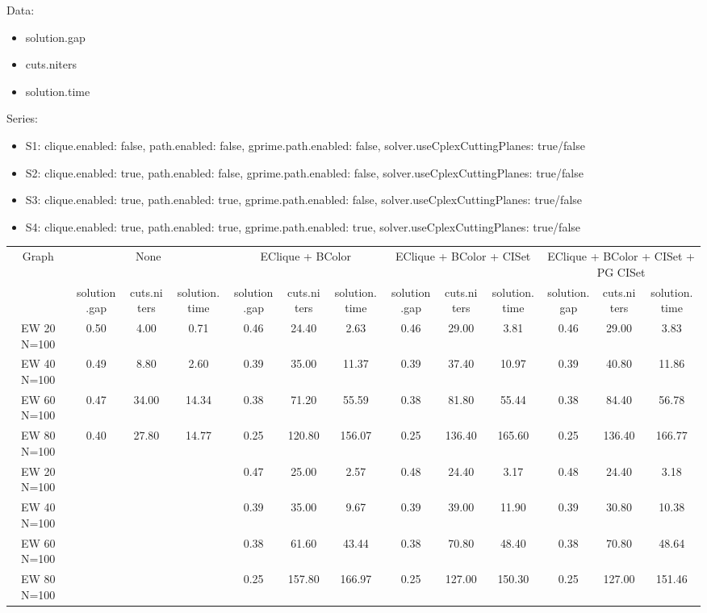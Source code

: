 \documentclass[landscape, 12pt]{report}
\begin{document}
	Data:
	\begin{itemize}
	\item solution.gap
	\item cuts.niters
	\item solution.time
	\end{itemize}
	Series:
	\begin{itemize}
	\item S1: clique.enabled: false, path.enabled: false, gprime.path.enabled: false, solver.useCplexCuttingPlanes: true/false
	\item S2: clique.enabled: true, path.enabled: false, gprime.path.enabled: false, solver.useCplexCuttingPlanes: true/false
	\item S3: clique.enabled: true, path.enabled: true, gprime.path.enabled: false, solver.useCplexCuttingPlanes: true/false
	\item S4: clique.enabled: true, path.enabled: true, gprime.path.enabled: true, solver.useCplexCuttingPlanes: true/false
	\end{itemize}
	\begin{tabular}{|c|ccc|ccc|ccc|ccc|}
	\hline
	\multicolumn{1}{|c|}{Graph} & \multicolumn{3}{|c|}{None} & \multicolumn{3}{|c|}{EClique + BColor} & \multicolumn{3}{|c|}{EClique + BColor + CISet} & \multicolumn{3}{|c|}{EClique + BColor + CISet + PG CISet}
	\\
	 & solution.gap & cuts.niters & solution.time & solution.gap & cuts.niters & solution.time & solution.gap & cuts.niters & solution.time & solution.gap & cuts.niters & solution.time
	\\
	\hline
	EW 20 N=100 & 0.50 & 4.00 & 0.71 & 0.46 & 24.40 & 2.63 & 0.46 & 29.00 & 3.81 & 0.46 & 29.00 & 3.83
	\\
	EW 40 N=100 & 0.49 & 8.80 & 2.60 & 0.39 & 35.00 & 11.37 & 0.39 & 37.40 & 10.97 & 0.39 & 40.80 & 11.86
	\\
	EW 60 N=100 & 0.47 & 34.00 & 14.34 & 0.38 & 71.20 & 55.59 & 0.38 & 81.80 & 55.44 & 0.38 & 84.40 & 56.78
	\\
	EW 80 N=100 & 0.40 & 27.80 & 14.77 & 0.25 & 120.80 & 156.07 & 0.25 & 136.40 & 165.60 & 0.25 & 136.40 & 166.77
	\\
	\hline 
	EW 20 N=100 & & & & 0.47 & 25.00 & 2.57 & 0.48 & 24.40 & 3.17 & 0.48 & 24.40 & 3.18
	\\
	EW 40 N=100 & & & & 0.39 & 35.00 & 9.67 & 0.39 & 39.00 & 11.90 & 0.39 & 30.80 & 10.38
	\\
	EW 60 N=100 & & & & 0.38 & 61.60 & 43.44 & 0.38 & 70.80 & 48.40 & 0.38 & 70.80 & 48.64
	\\
	EW 80 N=100 & & & & 0.25 & 157.80 & 166.97 & 0.25 & 127.00 & 150.30 & 0.25 & 127.00 & 151.46
	\\
	\hline
	 \end{tabular}
	
\end{document}
